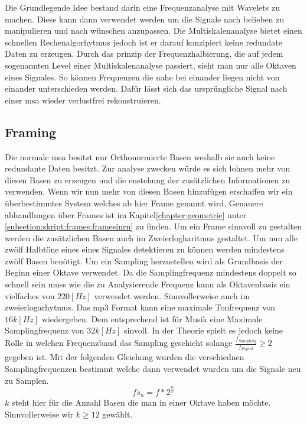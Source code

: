 



Die Grundlegende Idee bestand darin eine Frequenzanalyse mit Wavelets zu machen. Diese kann dann verwendet werden um die Signale nach belieben zu manipulieren und nach wünschen anzupassen. Die Multiskalenanalyse bietet einen schnellen Rechenalgorhytmus jedoch ist er darauf konzipiert keine redundate Daten zu erzeugen. Durch das prinzip der Frequenzhalbierung, die auf jedem sogenannten Level einer Multiskalenanalyse passiert, sieht man nur alle Oktaven eines Signales. So können Frequenzen die nahe bei einander liegen nicht von einander unterschieden werden. Dafür lässt sich das ursprüngliche Signal nach einer msa wieder verlustfrei rekonstruieren. 

\subsection{Framing}
Die normale msa besitzt nur Orthonormierte Basen weshalb sie auch keine redundante Daten besitzt. Zur analyse zwecken würde es sich lohnen mehr von diesen Basen zu erzeugen und die enstehung der zusätzlichen Informationen zu verwenden. Wenn wir nun mehr von diesen Basen hinzufügen erschaffen wir ein überbestimmtes System welches ab hier Frame genannt wird. Genauere abhandlungen über Frames ist im Kapitel\ref{chapter:geometrie} unter \ref{subsetion:skript:frames:framesinrn} zu finden. Um ein Frame sinnvoll zu gestalten werden die zusätzlichen Basen auch im Zweierlogharitmus gestaltet. Um nun alle zwölf Halbtöne eines eines Signales detektieren zu können werden mindestens zwölf Basen benötigt. Um ein Sampling herzustellen wird als Grundbasis der Beginn einer Oktave verwendet. Da die Samplingfrequenz mindestens doppelt so schnell sein muss wie die zu Analysierende Frequenz kann als Oktavenbasis ein vielfaches von $220[Hz]$ verwendet werden. Sinnvollerweise auch im zweierlogarhytmus. Das mp3 Format kann eine maximale Tonfrequenz von $16k[Hz]$ wiedergeben. Dem entsprechend ist für Musik eine Maximale Samplingfrequenz von $32k[Hz]$ sinvoll. In der Theorie spielt es jedoch keine Rolle in welchen Frequenzband das Sampling geschieht solange $\frac{f_{Sampling}}{f_{Signal}}\geq2$ gegeben ist. Mit der folgenden Gleichung wurden die verschiednen Samplingfrequenzen bestimmt welche dann verwendet wurden um die Signale neu zu Samplen. 
\begin{equation}
fs_{n}=f*2^{\frac{n}{k}}
\end{equation}
$k$ steht hier für die Anzahl Basen die man in einer Oktave haben möchte. Sinnvollerweise wir $k \geq 12$ gewählt.\\

